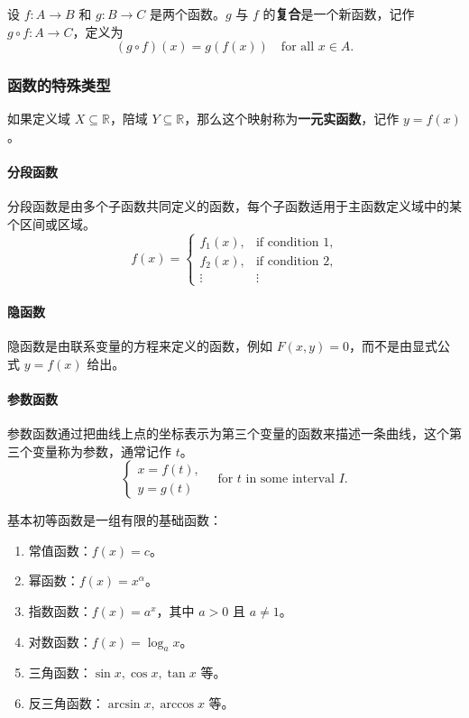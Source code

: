 \begin{definition}[函数复合]
设 $f:A\to B$ 和 $g:B\to C$ 是两个函数。$g$ 与 $f$ 的\textbf{复合}是一个新函数，记作 $g\circ f:A\to C$，定义为
\[
(g\circ f)(x)=g(f(x))\quad \text{for all }x\in A.
\]
\end{definition}

\subsubsection{函数的特殊类型}

\begin{definition}[实函数]
如果定义域 $X\subseteq\mathbb{R}$，陪域 $Y\subseteq\mathbb{R}$，那么这个映射称为\textbf{一元实函数}，记作 $y=f(x)$。
\end{definition}

\paragraph{分段函数}
分段函数是由多个子函数共同定义的函数，每个子函数适用于主函数定义域中的某个区间或区域。
\[
f(x)=\begin{cases}
    f_1(x), & \text{if condition 1},\\
    f_2(x), & \text{if condition 2},\\
    \vdots & \vdots
\end{cases}
\]

\paragraph{隐函数}
隐函数是由联系变量的方程来定义的函数，例如 $F(x,y)=0$，而不是由显式公式 $y=f(x)$ 给出。

\paragraph{参数函数}
参数函数通过把曲线上点的坐标表示为第三个变量的函数来描述一条曲线，这个第三个变量称为参数，通常记作 $t$。
\[
\begin{cases}
    x=f(t),\\
    y=g(t)
\end{cases}
\quad \text{for }t\text{ in some interval }I.
\]

\begin{definition}[基本初等函数]
基本初等函数是一组有限的基础函数：
\begin{enumerate}
    \item 常值函数：$f(x)=c$。
    \item 幂函数：$f(x)=x^{\alpha}$。
    \item 指数函数：$f(x)=a^x$，其中 $a>0$ 且 $a\ne1$。
    \item 对数函数：$f(x)=\log_a x$。
    \item 三角函数：$\sin x,\cos x,\tan x$ 等。
    \item 反三角函数：$\arcsin x,\arccos x$ 等。
\end{enumerate}
\end{definition}

